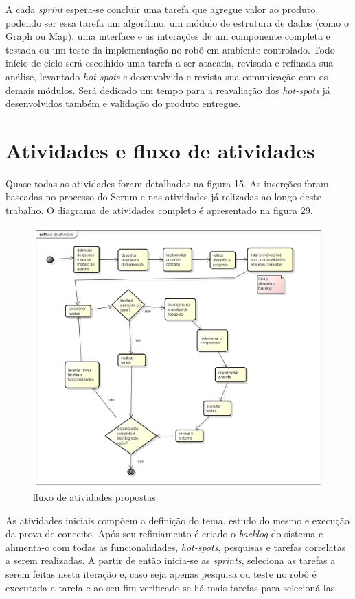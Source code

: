 A cada \textit{sprint} espera-se concluir uma tarefa que agregue valor ao produto, podendo ser essa tarefa um algorítmo, um módulo de estrutura de dados (como o Graph ou Map), uma interface e as interações de um componente completa e testada ou um teste da implementação no robô em ambiente controlado. Todo início de ciclo será escolhido uma tarefa a ser atacada, revisada e refinada sua análise, levantado \textit{hot-spots} e desenvolvida e revista sua comunicação com os demais módulos. Será dedicado um tempo para a reavaliação dos \textit{hot-spots} já desenvolvidos também e validação do produto entregue.

\section{Atividades e fluxo de atividades}

Quase todas as atividades foram detalhadas na figura 15. As inserções foram baseadas no processo do Scrum e nas atividades já relizadas ao longo deste trabalho. O diagrama de atividades completo é apresentado na figura 29.

\begin{figure}[h]
	\centering
	\label{fig29}
		\includegraphics[keepaspectratio=true,scale=0.4]{figuras/fluxoatvd.png}
	\caption{fluxo de atividades propostas}
\end{figure}

As atividades iniciais compõem a definição do tema, estudo do mesmo e execução da prova de conceito. Após seu refiniamento é criado o \textit{backlog} do sistema e alimenta-o com todas as funcionalidades, \textit{hot-spots}, pesquisas e tarefas correlatas a serem realizadas. A partir de então inicia-se as \textit{sprints}, seleciona as tarefas a serem feitas nesta iteração e, caso seja apenas pesquisa ou teste no robô é executada a tarefa e ao seu fim verificado se há mais tarefas para selecioná-las.

